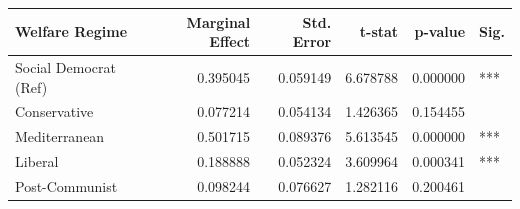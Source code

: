 \begin{tabular}{lrrrrl}
\toprule
Welfare Regime & Marginal Effect & Std. Error & t-stat & p-value & Sig. \\
\midrule
Social Democrat (Ref) & 0.395045 & 0.059149 & 6.678788 & 0.000000 & *** \\
Conservative & 0.077214 & 0.054134 & 1.426365 & 0.154455 &  \\
Mediterranean & 0.501715 & 0.089376 & 5.613545 & 0.000000 & *** \\
Liberal & 0.188888 & 0.052324 & 3.609964 & 0.000341 & *** \\
Post-Communist & 0.098244 & 0.076627 & 1.282116 & 0.200461 &  \\
\bottomrule
\end{tabular}
